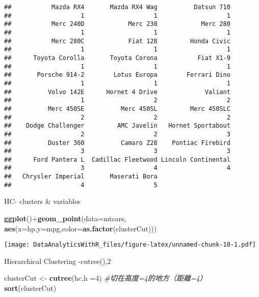 \documentclass[]{book}
\newenvironment{Shaded}{\begin{snugshade}}{\end{snugshade}}
\newcommand{\KeywordTok}[1]{\textcolor[rgb]{0.13,0.29,0.53}{\textbf{{#1}}}}
\newcommand{\DataTypeTok}[1]{\textcolor[rgb]{0.13,0.29,0.53}{{#1}}}
\newcommand{\DecValTok}[1]{\textcolor[rgb]{0.00,0.00,0.81}{{#1}}}
\newcommand{\StringTok}[1]{\textcolor[rgb]{0.31,0.60,0.02}{{#1}}}
\newcommand{\CommentTok}[1]{\textcolor[rgb]{0.56,0.35,0.01}{\textit{{#1}}}}
\newcommand{\NormalTok}[1]{{#1}}
\begin{document}
\begin{verbatim}
##           Mazda RX4       Mazda RX4 Wag          Datsun 710 
##                   1                   1                   1 
##           Merc 240D            Merc 230            Merc 280 
##                   1                   1                   1 
##           Merc 280C            Fiat 128         Honda Civic 
##                   1                   1                   1 
##      Toyota Corolla       Toyota Corona           Fiat X1-9 
##                   1                   1                   1 
##       Porsche 914-2        Lotus Europa        Ferrari Dino 
##                   1                   1                   1 
##          Volvo 142E      Hornet 4 Drive             Valiant 
##                   1                   2                   2 
##          Merc 450SE          Merc 450SL         Merc 450SLC 
##                   2                   2                   2 
##    Dodge Challenger         AMC Javelin   Hornet Sportabout 
##                   2                   2                   3 
##          Duster 360          Camaro Z28    Pontiac Firebird 
##                   3                   3                   3 
##      Ford Pantera L  Cadillac Fleetwood Lincoln Continental 
##                   3                   4                   4 
##   Chrysler Imperial       Maserati Bora 
##                   4                   5
\end{verbatim}

HC- clusters \& variables

\begin{Shaded}
\begin{Highlighting}[]
\KeywordTok{ggplot}\NormalTok{()+}\KeywordTok{geom_point}\NormalTok{(}\DataTypeTok{data=}\NormalTok{mtcars,}
                    \KeywordTok{aes}\NormalTok{(}\DataTypeTok{x=}\NormalTok{hp,}\DataTypeTok{y=}\NormalTok{mpg,}\DataTypeTok{color=}\KeywordTok{as.factor}\NormalTok{(clusterCut)))}
\end{Highlighting}
\end{Shaded}

\texttt{[image: DataAnalyticsWithR\_files/figure-latex/unnamed-chunk-10-1.pdf]}

Hierarchical Clustering -cutree(),2

\begin{Shaded}
\begin{Highlighting}[]
\NormalTok{clusterCut <-}\StringTok{ }\KeywordTok{cutree}\NormalTok{(hc,}\DataTypeTok{h =}\DecValTok{4}\NormalTok{) }\CommentTok{#切在高度=4的地方（距離=4）}
\KeywordTok{sort}\NormalTok{(clusterCut)}
\end{Highlighting}
\end{Shaded}
\end{document}
